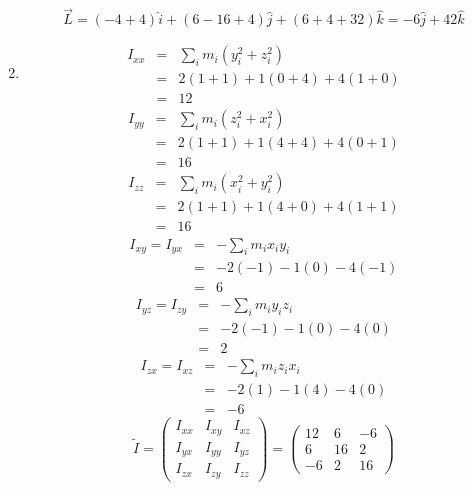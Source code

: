 \documentclass[a4paper,11pt,fleqn]{article}
\newcommand{\n}{\newline}
\begin{document}
\begin{enumerate}[start=12]
\[
	\vec{L} = ( -4 +4 ) \hat{i} + ( 6 -16 +4 ) \hat{j} + ( 6 + 4 + 32 ) \hat{k} = -6 \hat{j} + 42 \hat{k}
\]
\n


\newpage
\item
\begin{eqnarray*}
	I_{xx} &=& \sum_i m_i ( y_i^2 + z_i ^2 ) \\
	&=& 2(1+1) + 1(0+4) + 4(1+0) \\
	&=& 12
\end{eqnarray*}
\begin{eqnarray*}
	I_{yy} &=& \sum_i m_i ( z_i^2 + x_i ^2 ) \\
	&=& 2(1+1) + 1(4+4) + 4(0+1) \\
	&=& 16
\end{eqnarray*}
\begin{eqnarray*}
	I_{zz} &=& \sum_i m_i ( x_i^2 + y_i ^2 ) \\
	&=& 2(1+1) + 1(4+0) + 4(1+1) \\
	&=& 16
\end{eqnarray*}
\begin{eqnarray*}
	I_{xy} = I_{yx} &=& - \sum_i m_i x_i y_i \\
	&=& -2(-1) - 1(0) - 4(-1) \\
	&=& 6
\end{eqnarray*}
\begin{eqnarray*}
	I_{yz} = I_{zy} &=& - \sum_i m_i y_i z_i \\
	&=& -2(-1) - 1(0) - 4(0) \\
	&=& 2
\end{eqnarray*}
\begin{eqnarray*}
	I_{zx} = I_{xz} &=& - \sum_i m_i z_i x_i \\
	&=& -2(1) - 1(4) - 4(0) \\
	&=& -6
\end{eqnarray*}
\[
\tilde{I} = \begin{pmatrix}
	I_{xx} & I_{xy} & I_{xz} \\
	I_{yx} & I_{yy} & I_{yz} \\
	I_{zx} & I_{zy} & I_{zz}
	\end{pmatrix} = 
	\begin{pmatrix}
		12 & 6 & -6 \\
		6 & 16 & 2 \\
		-6 & 2 & 16
	\end{pmatrix}
\]
\n\n



\end{enumerate}
\end{document}
